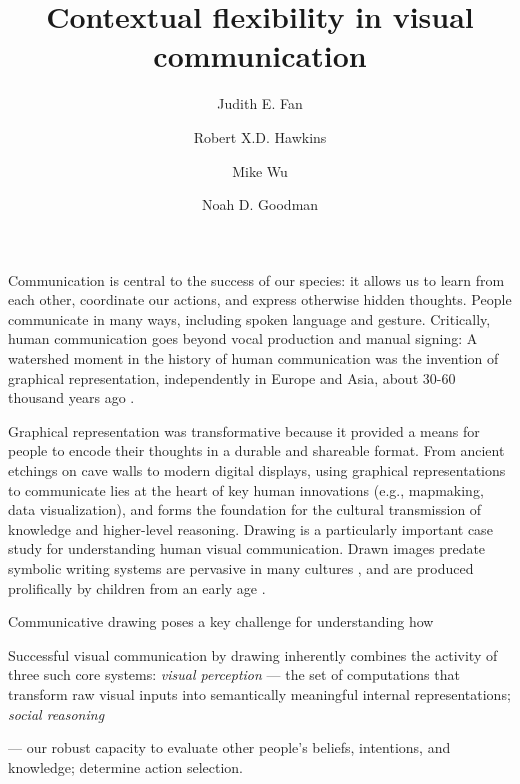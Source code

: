 \documentclass[9pt,twocolumn,twoside]{pnas-new}
\title{Contextual flexibility in visual communication}
\author[a,1]{Judith E. Fan}
\author[a]{Robert X.D. Hawkins}
\author[b]{Mike Wu}
\author[a,b]{Noah D. Goodman}
\affil[a]{Department of Psychology, Stanford University}
\affil[b]{Department of Computer Science, Stanford University}
\begin{document}
\verticaladjustment{-2pt}

\maketitle
\thispagestyle{firststyle}

Communication is central to the success of our species: it allows us to learn from each other, coordinate our actions, and express otherwise hidden thoughts. People communicate in many ways, including spoken language and gesture. Critically, human communication goes beyond vocal production and manual signing: A watershed moment in the history of human communication was the invention of graphical representation, independently in Europe and Asia, about 30-60 thousand years ago \cite{hoffmann2018u,Aubert:2014jy}.

Graphical representation was transformative because it provided a means for people to encode their thoughts in a durable and shareable format. From ancient etchings on cave walls to modern digital displays, using graphical representations to communicate lies at the heart of key human innovations (e.g., mapmaking, data visualization), and forms the foundation for the cultural transmission of knowledge and higher-level reasoning. Drawing is a particularly important case study for understanding human visual communication. Drawn images predate symbolic writing systems \cite{clottes2008cave} are pervasive in many cultures \cite{gombrich1989story}, and are produced prolifically by children from an early age \cite{kellogg1969analyzing}.


Communicative drawing poses a key challenge for understanding how

Successful visual communication by drawing inherently combines the activity of three such core systems: \textit{visual perception} --- the set of computations that transform raw visual inputs into semantically meaningful internal representations; \textit{social reasoning}

--- our robust capacity to evaluate other people's beliefs, intentions, and knowledge; determine action selection.
\end{document}
